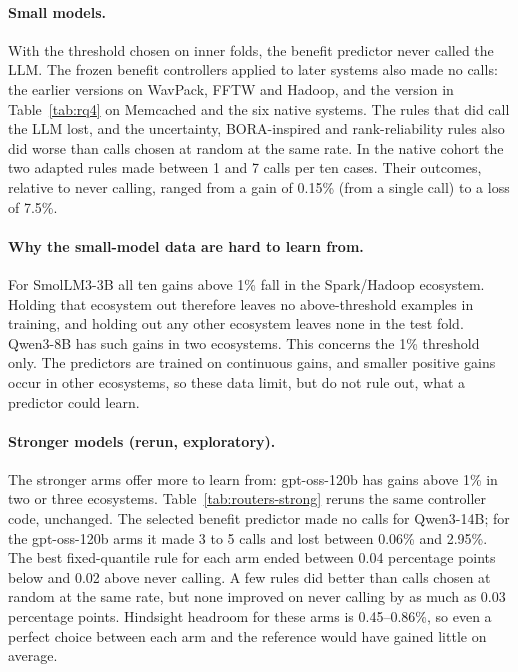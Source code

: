 \paragraph{Small models.} With the threshold chosen on inner folds, the benefit predictor never called the LLM. The frozen benefit controllers applied to later systems also made no calls: the earlier versions on WavPack, FFTW and Hadoop, and the version in Table~\ref{tab:rq4} on Memcached and the six native systems. The rules that did call the LLM lost, and the uncertainty, BORA-inspired and rank-reliability rules also did worse than calls chosen at random at the same rate. In the native cohort the two adapted rules made between 1 and 7 calls per ten cases. Their outcomes, relative to never calling, ranged from a gain of 0.15\% (from a single call) to a loss of 7.5\%.

\paragraph{Why the small-model data are hard to learn from.} For SmolLM3-3B all ten gains above 1\% fall in the Spark/Hadoop ecosystem. Holding that ecosystem out therefore leaves no above-threshold examples in training, and holding out any other ecosystem leaves none in the test fold. Qwen3-8B has such gains in two ecosystems. This concerns the 1\% threshold only. The predictors are trained on continuous gains, and smaller positive gains occur in other ecosystems, so these data limit, but do not rule out, what a predictor could learn.

\paragraph{Stronger models (rerun, exploratory).} The stronger arms offer more to learn from: gpt-oss-120b has gains above 1\% in two or three ecosystems. Table~\ref{tab:routers-strong} reruns the same controller code, unchanged. The selected benefit predictor made no calls for Qwen3-14B; for the gpt-oss-120b arms it made 3 to 5 calls and lost between 0.06\% and 2.95\%. The best fixed-quantile rule for each arm ended between 0.04 percentage points below and 0.02 above never calling. A few rules did better than calls chosen at random at the same rate, but none improved on never calling by as much as 0.03 percentage points. Hindsight headroom for these arms is 0.45--0.86\%, so even a perfect choice between each arm and the reference would have gained little on average.

